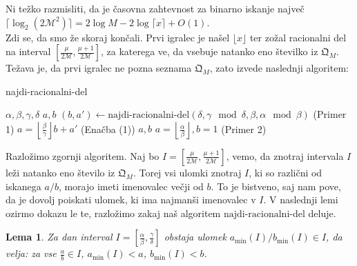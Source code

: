 \documentclass[a4paper,14pt]{article}
\theoremstyle{definition} %
\theoremstyle{plain} %
\newtheorem{lema}[definition]{Lema}
\begin{document}
Ni težko razmisliti, da je časovna zahtevnost za binarno iskanje  največ $\lceil \log_2( 2\mathcal{M}^2)\rceil = 2\log M- 2\log\lceil x \rceil + O(1)$.\\
Zdi se, da smo že skoraj končali. Prvi igralec je našel $\lfloor x \rfloor$ ter zožal racionalni del na interval $ \left[\frac{\mu}{2\mathcal{M}}, \frac{\mu +1}{2\mathcal{M}}\right]$, 
za katerega ve, da vsebuje natanko eno številko iz $\mathfrak{Q}_M$. Težava je, da prvi igralec ne pozna seznama $\mathfrak{Q}_M$, zato izvede naslednji algoritem:
\begin{algorithm}
    \caption{najdi-racionalni-del}
    \begin{algorithmic}[1]
    \REQUIRE $\alpha, \beta, \gamma, \delta$
    \ENSURE $a, b$
        \STATE $(b, a') \leftarrow \text{najdi-racionalni-del}(\delta, \gamma \mod \delta, \beta, \alpha \mod \beta)$ \hfill (Primer 1)
        \STATE $a = \left\lfloor \frac{\beta}{\gamma} \right\rfloor b + a'$ \hfill (Enačba (1))
        \RETURN $a, b$
    \ELSE
        \RETURN $a = \left\lfloor \frac{\alpha}{\beta} \right\rfloor, b = 1$ \hfill (Primer 2)
    \ENDIF
    \end{algorithmic}
    \end{algorithm}
  
Razložimo zgornji algoritem. Naj bo $ I=\left[\frac{\mu}{2\mathcal{M}}, \frac{\mu +1}{2\mathcal{M}}\right]$,
vemo, da znotraj intervala $I$ leži natanko eno število iz $\mathfrak{Q}_M$.
Torej vsi ulomki znotraj $I$, ki so različni od iskanega $a/b$, morajo imeti imenovalec večji od $b$.
To je bistveno, saj nam pove, da je dovolj poiskati ulomek, ki ima najmanši imenovalec v $I$.
V naslednji lemi ozirmo dokazu le te, razložimo zakaj naš algoritem $\text{najdi-racionalni-del}$ deluje.\newpage


\begin{lema}
    Za dan interval $I =\left[ \frac{\alpha}{\beta}, \frac{\gamma}{\delta}\right]$ obstaja ulomek $a_{\min}(I)/b_{\min}(I)\in I$, 
    da velja: za vse $\frac{a}{b} \in I$, $a_{\min}(I) < a$, $b_{\min}(I) < b$.

\end{lema}
\end{document}
